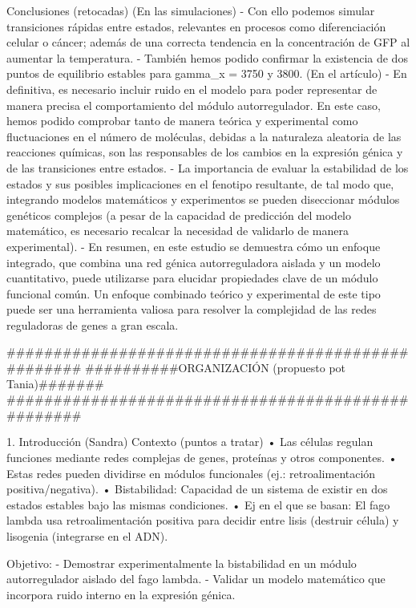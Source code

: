 Conclusiones (retocadas)
	(En las simulaciones)
	- Con ello podemos simular transiciones rápidas entre estados, relevantes en procesos como diferenciación celular o cáncer; además de una correcta tendencia en la concentración de GFP al aumentar la temperatura.
	- También hemos podido confirmar la existencia de dos puntos de equilibrio estables para gamma_x = 3750 y 3800.
	(En el artículo)
	- En definitiva, es necesario incluir ruido en el modelo para poder representar de manera precisa el comportamiento del módulo autorregulador. En este caso, hemos podido comprobar tanto de manera teórica y experimental como fluctuaciones en el número de moléculas, debidas a la naturaleza aleatoria de las reacciones químicas, son las responsables de los cambios en la expresión génica y de las transiciones entre estados. 
	- La importancia de evaluar la estabilidad de los estados y sus posibles implicaciones en el fenotipo resultante, de tal modo que, integrando modelos matemáticos y experimentos se pueden diseccionar módulos genéticos complejos (a pesar de la capacidad de predicción del modelo matemático, es necesario recalcar la necesidad de validarlo de manera experimental).
	- En resumen, en este estudio se demuestra cómo un enfoque integrado, que combina una red génica autorreguladora aislada y un modelo cuantitativo, puede utilizarse para elucidar propiedades clave de un módulo funcional común. Un enfoque combinado teórico y experimental de este tipo puede ser una herramienta valiosa para resolver la complejidad de las redes reguladoras de genes a gran escala.



###################################################
##########ORGANIZACIÓN (propuesto pot Tania)#######
###################################################

1. Introducción (Sandra)
Contexto (puntos a tratar)
•	Las células regulan funciones mediante redes complejas de genes, proteínas y otros componentes.
•	Estas redes pueden dividirse en módulos funcionales (ej.: retroalimentación positiva/negativa).
•	Bistabilidad: Capacidad de un sistema de existir en dos estados estables bajo las mismas condiciones.
•	Ej en el que se basan: El fago lambda usa retroalimentación positiva para decidir entre lisis (destruir célula) y lisogenia (integrarse en el ADN).

Objetivo:
- Demostrar experimentalmente la bistabilidad en un módulo autorregulador aislado del fago lambda.
- Validar un modelo matemático que incorpora ruido interno en la expresión génica.

